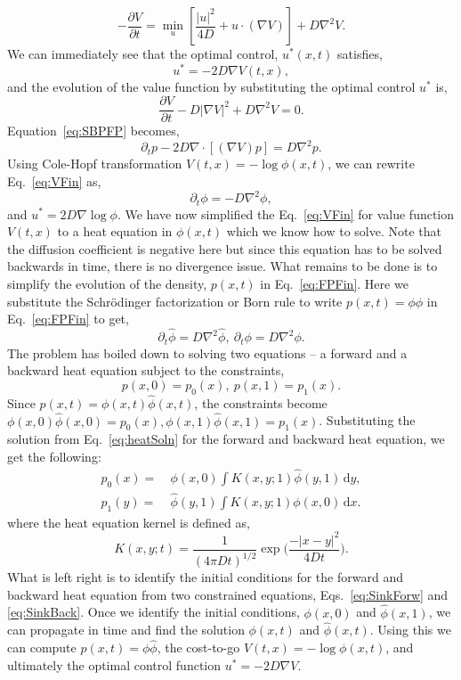 \documentclass[12pt]{article}
\def\d{\mathrm{d}}
\def\grad{\nabla}
\def\phih{\hat{\phi}}
\begin{document}
\begin{singlespace}
\[
    -\frac{\partial V}{\partial t} = \min_{u} \left[ \frac{|u|^2}{4D} + u \cdot (\grad V) \right] + D \grad^2 V.
\]
We can immediately see that the optimal control, $u^*(x, t)$ satisfies,
\begin{equation}
    u^* = -2D \grad V(t, x),
\end{equation}
and the evolution of the value function by substituting the optimal control $u^*$ is,
\begin{equation}
    \frac{\partial V}{\partial t} - D |\grad V|^2 + D \grad^2 V = 0. \label{eq:VFin}
\end{equation}
Equation~\ref{eq:SBPFP} becomes,
\begin{equation}
\partial_t p - 2D \grad \cdot [ (\grad V) p] = D \grad^2 p. \label{eq:FPFin}
\end{equation}
Using Cole-Hopf transformation $V(t, x) = - \log \phi(x, t)$, we can rewrite Eq.~\ref{eq:VFin} as,
\[
\partial_t \phi = - D \nabla^2 \phi,
\]
and $u^* = 2 D \grad \log \phi$.
We have now simplified the Eq.~\ref{eq:VFin} for value function $V(t, x)$ to a heat equation in $\phi(x, t)$ which we know how to solve. Note that the diffusion coefficient is negative here but since this equation has to be solved backwards in time, there is no divergence issue. What remains to be done is to simplify the evolution of the density, $p(x, t)$ in Eq.~\ref{eq:FPFin}. Here we substitute the Schr\"odinger factorization or Born rule to write $p(x, t) = \phi \phih$ in Eq.~\ref{eq:FPFin} to get,
\[
\partial_t \phih = D\nabla^2\phih,\ \partial_t \phi = D \nabla^2 \phi.
\]
The problem has boiled down to solving two equations -- a forward and a backward heat equation subject to the constraints,
\[p(x,0) = p_{0}(x),\ p(x, 1) = p_{1}(x).\]
Since $p(x,t) = \phi(x,t)\phih(x,t)$, the constraints become
$\phi(x,0)\phih(x,0) = p_{0}(x), \phi(x, 1)\phih(x,1) = p_{1}(x)$. Substituting the solution from Eq.~\ref{eq:heatSoln} for the forward and backward heat equation, we get the following:
\begin{align}
p_0(x) =&\ \phi(x,0)\int K(x,y; 1)\phih(y,1)\,\d y,\label{eq:SinkForw} \\
p_1(y) =&\ \phih(y,1)\int K(x,y; 1)\phi(x,0)\,\d x.\label{eq:SinkBack}
\end{align}
where the heat equation kernel is defined as, 
\[
K(x,y; t) = \dfrac{1}{(4\pi Dt)^{1/2}}\exp\bigg( 
\frac{-|x-y|^2}{4Dt}
\bigg).
\]
What is left right is to identify the initial conditions for the forward and backward heat equation from two constrained equations, Eqs.~\ref{eq:SinkForw} and \ref{eq:SinkBack}. Once we identify the initial conditions, $\phi(x, 0)$ and $\phih(x, 1)$, we can propagate in time and find the solution $\phi(x, t)$ and $\phih(x,t)$. Using this we can compute $p(x, t) =\phi\phih$, the cost-to-go $V(t,x)=-\log\phi(x,t)$, and ultimately the optimal control function $u^* = -2D\grad V$.


\end{singlespace}
\end{document}
